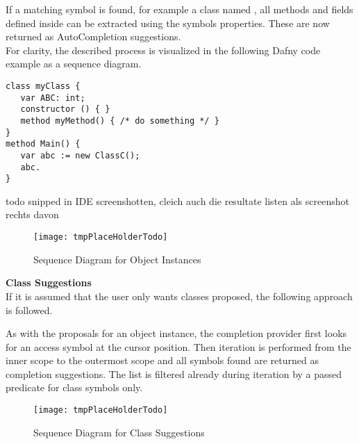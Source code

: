 If a matching symbol is found, for example a class named , all methods and fields defined inside 
can be extracted using the symbols properties.
These are now returned as AutoCompletion suggestions. \\

For clarity, the described process is visualized in the following
Dafny code example  as a sequence diagram.

\begin{lstlisting}[language=dafny, caption={tmptodo.dfy}, captionpos=b, label={lst:tmptodo}]
class myClass {
   var ABC: int;
   constructor () { }
   method myMethod() { /* do something */ }
}
method Main() {
   var abc := new ClassC();
   abc.
}
\end{lstlisting}

todo snipped in IDE screenshotten, cleich auch die resultate listen als screenshot rechts davon

\begin{figure}[H]
    \centering
    \texttt{[image: tmpPlaceHolderTodo]}
    \caption{Sequence Diagram for Object Instances}
    \label{fig:object_completion_diagram}
\end{figure}

\textbf{Class Suggestions}\\
If it is assumed that the user only wants classes proposed, the following approach is followed.

As with the proposals for an object instance,
the completion provider first looks for an access symbol at the cursor position.
Then iteration is performed from the inner scope
to the outermost scope and all symbols found are returned as completion suggestions.
The list is filtered already during iteration by a passed predicate for class symbols only.


\begin{figure}[H]
    \centering
    \texttt{[image: tmpPlaceHolderTodo]}
    \caption{Sequence Diagram for Class Suggestions}
    \label{fig:new_completion_diagram}
\end{figure}

